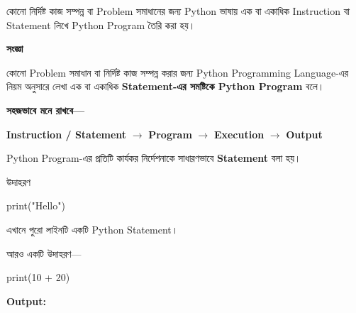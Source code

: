 
কোনো নির্দিষ্ট কাজ সম্পন্ন বা Problem সমাধানের জন্য Python
ভাষায় এক বা একাধিক Instruction বা Statement লিখে
Python Program তৈরি করা হয়।



\begin{definitionbox}

\textbf{\color{darkTeal}সংজ্ঞা}

কোনো Problem সমাধান বা নির্দিষ্ট কাজ সম্পন্ন করার জন্য
Python Programming Language-এর নিয়ম অনুসারে লেখা
এক বা একাধিক \textbf{Statement-এর সমষ্টিকে Python Program}
বলে।

\end{definitionbox}

\textbf{সহজভাবে মনে রাখবে—}

\begin{center}

\textbf{Instruction / Statement}
\(\longrightarrow\)
\textbf{Program}
\(\longrightarrow\)
\textbf{Execution}
\(\longrightarrow\)
\textbf{Output}

\end{center}



Python Program-এর প্রতিটি কার্যকর নির্দেশনাকে সাধারণভাবে
\textbf{Statement} বলা হয়।

\begin{examplebox}{উদাহরণ}

\begin{codebox}

\begin{english}
\ttfamily
print("Hello")
\end{english}

\end{codebox}

এখানে পুরো লাইনটি একটি Python Statement।

\medskip

আরও একটি উদাহরণ—

\begin{codebox}

\begin{english}
\ttfamily
print(10 + 20)
\end{english}

\end{codebox}

\textbf{Output:}

\begin{codebox}

\begin{english}
\end{english}

\end{codebox}

\end{examplebox}

